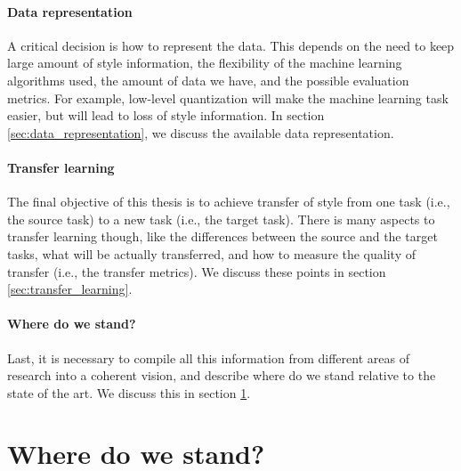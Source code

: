 \paragraph{Data representation} A critical decision is how to represent the data. This depends on the need to keep large amount of style information, the flexibility of the machine learning algorithms used, the amount of data we have, and the possible evaluation metrics. For example, low-level quantization will make the machine learning task easier, but will lead to loss of style information. In section \ref{sec:data_representation}, we discuss the available data representation.

\paragraph{Transfer learning} The final objective of this thesis is to achieve transfer of style from one task (i.e., the source task) to a new task (i.e., the target task). There is many aspects to transfer learning though, like the differences between the source and the target tasks, what will be actually transferred, and how to measure the quality of transfer (i.e., the transfer metrics). We discuss these points in section \ref{sec:transfer_learning}.

\paragraph{Where do we stand?} Last, it is necessary to compile all this information from different areas of research into a coherent vision, and describe where do we stand relative to the state of the art. We discuss this in section \ref{sec:conclusions}.



\section{Where do we stand?}\label{sec:conclusions}
